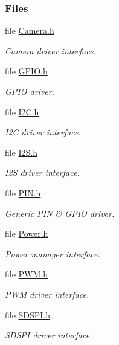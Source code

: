 \subsubsection*{Files}
\begin{DoxyCompactItemize}
\item 
file \hyperlink{_camera_8h}{Camera.\+h}
\begin{DoxyCompactList}\small\item\em Camera driver interface. \end{DoxyCompactList}\item 
file \hyperlink{_g_p_i_o_8h}{G\+P\+I\+O.\+h}
\begin{DoxyCompactList}\small\item\em G\+P\+I\+O driver. \end{DoxyCompactList}\item 
file \hyperlink{_i2_c_8h}{I2\+C.\+h}
\begin{DoxyCompactList}\small\item\em I2\+C driver interface. \end{DoxyCompactList}\item 
file \hyperlink{_i2_s_8h}{I2\+S.\+h}
\begin{DoxyCompactList}\small\item\em I2\+S driver interface. \end{DoxyCompactList}\item 
file \hyperlink{_p_i_n_8h}{P\+I\+N.\+h}
\begin{DoxyCompactList}\small\item\em Generic P\+I\+N \& G\+P\+I\+O driver. \end{DoxyCompactList}\item 
file \hyperlink{_power_8h}{Power.\+h}
\begin{DoxyCompactList}\small\item\em Power manager interface. \end{DoxyCompactList}\item 
file \hyperlink{_p_w_m_8h}{P\+W\+M.\+h}
\begin{DoxyCompactList}\small\item\em P\+W\+M driver interface. \end{DoxyCompactList}\item 
file \hyperlink{_s_d_s_p_i_8h}{S\+D\+S\+P\+I.\+h}
\begin{DoxyCompactList}\small\item\em S\+D\+S\+P\+I driver interface. \end{DoxyCompactList}\item 

\end{DoxyCompactItemize}
